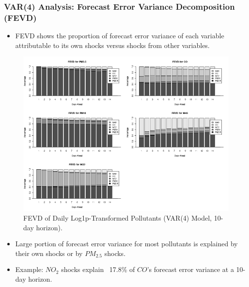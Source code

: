 \documentclass[svgnames, 12pt]{beamer}
\begin{document}
\begin{frame}
    \frametitle{VAR(4) Analysis: Forecast Error Variance Decomposition (FEVD)}
    \begin{itemize}
        \item FEVD shows the proportion of forecast error variance of each variable attributable to its own shocks versus shocks from other variables.
    \end{itemize}
    \begin{figure}
        \includegraphics[width=0.9\linewidth]{../analysis/assets/fevd_delhi.png}
        \caption{FEVD of Daily Log1p-Transformed Pollutants (VAR(4) Model, 10-day horizon).}
    \end{figure}
    \begin{itemize}
        \item \footnotesize Large portion of forecast error variance for most pollutants is explained by their own shocks or by $PM_{2.5}$ shocks.
        \item \footnotesize Example: $NO_2$ shocks explain ~17.8\% of $CO$'s forecast error variance at a 10-day horizon.
    \end{itemize}
\end{frame}
\end{document}
